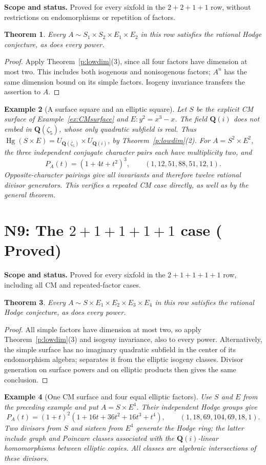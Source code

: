 \documentclass[11pt,reqno]{article}
\theoremstyle{emphasizedplain}
\DeclareRobustCommand{\provedstatus}{%
  \texorpdfstring{\textcolor{ProvedGreen}{\textbf{Proved}}}{Proved}}
\newtheorem{theorem}{Theorem}[section]
\theoremstyle{emphasizeddefinition}
\newtheorem{example}[theorem]{Example}
\theoremstyle{emphasizeddefinition}
\DeclareMathOperator{\Hg}{Hg}
\newcommand{\Q}{\mathbf Q}
\newcommand{\status}[1]{%
  \par\nobreak\smallskip\noindent
  {\setlength{\fboxsep}{7pt}%
   \colorbox{ScopeBackground}{%
    \parbox{\dimexpr\linewidth-2\fboxsep\relax}{%
     \small\textbf{\textcolor{HeadingInk}{Scope and status.}} #1}}}%
  \par\nobreak\medskip}
\begin{document}
\status{Proved for every sixfold in the $2+2+1+1$ row, without
restrictions on endomorphisms or repetition of factors.}
\begin{theorem}
Every $A\sim S_1\times S_2\times E_1\times E_2$ in this row satisfies
the rational Hodge conjecture, as does every power.
\end{theorem}
\begin{proof}
Apply Theorem~\ref{p:lowdim}(3), since all four factors have dimension
at most two. This includes both isogenous and nonisogenous factors;
$A^n$ has the same dimension bound on its simple factors. Isogeny
invariance transfers the assertion to $A$.
\end{proof}
\begin{example}[A surface square and an elliptic square]
Let $S$ be the explicit CM surface of Example~\ref{ex:CMsurface} and
$E:y^2=x^3-x$. The field $\Q(i)$ does not embed in $\Q(\zeta_5)$,
whose only quadratic subfield is real. Thus
$\Hg(S\times E)=U_{\Q(\zeta_5)}\times U_{\Q(i)}$, by
Theorem~\ref{p:lowdim}(2). For $A=S^2\times E^2$, the three independent
conjugate character pairs each have multiplicity two, and
\[
 P_A(t)=(1+4t+t^2)^3,
 \qquad (1,12,51,88,51,12,1).
\]
Opposite-character pairings give all invariants and therefore twelve
rational divisor generators. This verifies a repeated CM case directly,
as well as by the general theorem.
\end{example}
\section{N9: The \texorpdfstring{$2+1+1+1+1$}{2+1+1+1+1} case (\provedstatus)}\label{sec:N9}

\status{Proved for every sixfold in the $2+1+1+1+1$ row, including
all CM and repeated-factor cases.}
\begin{theorem}
Every $A\sim S\times E_1\times E_2\times E_3\times E_4$ in this row
satisfies the rational Hodge conjecture, as does every power.
\end{theorem}
\begin{proof}
All simple factors have dimension at most two, so apply
Theorem~\ref{p:lowdim}(3) and isogeny invariance, also to every power.
Alternatively, the simple surface has no imaginary quadratic subfield
in the center of its endomorphism algebra; \cite[Proposition (3.8)]{MZ}
separates it from the elliptic isogeny classes. Divisor generation on
surface powers and on elliptic products then gives the same conclusion.
\end{proof}
\begin{example}[One CM surface and four equal elliptic factors]
Use $S$ and $E$ from the preceding example and put $A=S\times E^4$.
Their independent Hodge groups give
\[
 P_A(t)=(1+t)^2(1+16t+36t^2+16t^3+t^4),
 \qquad (1,18,69,104,69,18,1).
\]
Two divisors from $S$ and sixteen from $E^4$ generate the Hodge ring;
the latter include graph and Poincare classes associated with the
$\Q(i)$-linear homomorphisms between elliptic copies.
All classes are algebraic intersections of these divisors.
\end{example}
\end{document}
